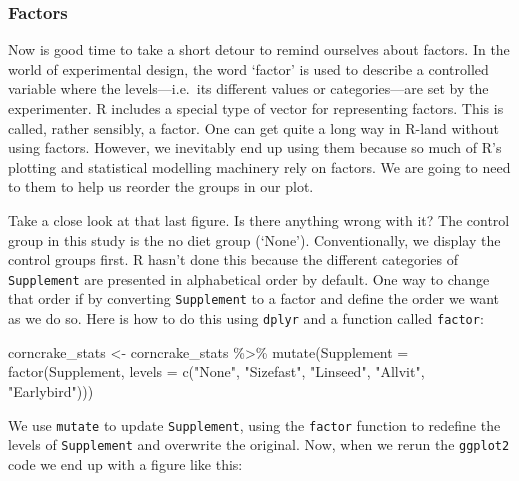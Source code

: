 \documentclass[
]{book}
\newenvironment{Shaded}{\begin{snugshade}}{\end{snugshade}}
\newcommand{\AttributeTok}[1]{\textcolor[rgb]{0.77,0.63,0.00}{#1}}
\newcommand{\FunctionTok}[1]{\textcolor[rgb]{0.00,0.00,0.00}{#1}}
\newcommand{\NormalTok}[1]{#1}
\newcommand{\OtherTok}[1]{\textcolor[rgb]{0.56,0.35,0.01}{#1}}
\newcommand{\SpecialCharTok}[1]{\textcolor[rgb]{0.00,0.00,0.00}{#1}}
\newcommand{\StringTok}[1]{\textcolor[rgb]{0.31,0.60,0.02}{#1}}
\newenvironment{greybox}{
  \definecolor{shadecolor}{rgb}{0.95,0.95,0.95}  %
  \color{black}
  \begin{shaded}}
 {\end{shaded}}
\newenvironment{infobox}[1]
  {
  \begin{itemize}
  \renewcommand{\labelitemi}{
    \raisebox{-.7\height}[0pt][0pt]{
      {\setkeys{Gin}{width=3em,keepaspectratio}
        \texttt{[image: images/\#1]}}
    }
  }
  \setlength{\fboxsep}{1em}
  \begin{greybox}
  \item
  }
  {
  \end{greybox}
  \end{itemize}
  }
\begin{document}
\begin{infobox}{information}

\hypertarget{factors}{%
\subsubsection*{Factors}\label{factors}}

Now is good time to take a short detour to remind ourselves about factors. In the world of experimental design, the word `factor' is used to describe a controlled variable where the levels---i.e.~its different values or categories---are set by the experimenter. R includes a special type of vector for representing factors. This is called, rather sensibly, a factor. One can get quite a long way in R-land without using factors. However, we inevitably end up using them because so much of R's plotting and statistical modelling machinery rely on factors. We are going to need to them to help us reorder the groups in our plot.

\end{infobox}

Take a close look at that last figure. Is there anything wrong with it? The control group in this study is the no diet group (`None'). Conventionally, we display the control groups first. R hasn't done this because the different categories of \texttt{Supplement} are presented in alphabetical order by default. One way to change that order if by converting \texttt{Supplement} to a factor and define the order we want as we do so. Here is how to do this using \texttt{dplyr} and a function called \texttt{factor}:

\begin{Shaded}
\begin{Highlighting}[]
\NormalTok{corncrake\_stats }\OtherTok{\textless{}{-}} 
\NormalTok{  corncrake\_stats }\SpecialCharTok{\%\textgreater{}\%} 
  \FunctionTok{mutate}\NormalTok{(}\AttributeTok{Supplement =} \FunctionTok{factor}\NormalTok{(Supplement, }
                             \AttributeTok{levels =} \FunctionTok{c}\NormalTok{(}\StringTok{"None"}\NormalTok{, }\StringTok{"Sizefast"}\NormalTok{, }\StringTok{"Linseed"}\NormalTok{, }\StringTok{"Allvit"}\NormalTok{, }\StringTok{"Earlybird"}\NormalTok{)))}
\end{Highlighting}
\end{Shaded}

We use \texttt{mutate} to update \texttt{Supplement}, using the \texttt{factor} function to redefine the levels of \texttt{Supplement} and overwrite the original. Now, when we rerun the \texttt{ggplot2} code we end up with a figure like this:
\end{document}
